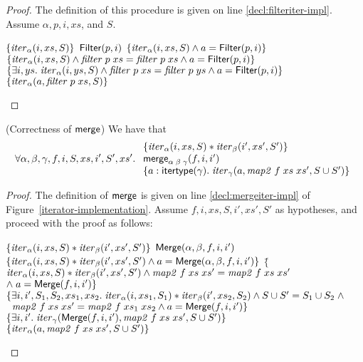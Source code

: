 \begin{proof}
The definition of this procedure is given on line \ref{decl:filteriter-impl}. Assume
$\alpha, p, i, xs$, and $S$. 

\begin{specification}
\nextline $\{{\mathit{iter}_\alpha(i, xs, S)}\}$ 
\nextline $\mathsf{Filter}(p, i)$ 
\nextline $\{{\mathit{iter}_\alpha(i, xs, S) \land a = \mathsf{Filter}(p, i)}\}$ 
\nextline $\{{\mathit{iter}_\alpha(i, xs, S) \land \mathit{filter}\;p\;xs = \mathit{filter}\;p\;xs \land a = \mathsf{Filter}(p, i)}\}$ 
\nextline $\{{\exists i, ys.\; \mathit{iter}_\alpha(i, ys, S) \land \mathit{filter}\;p\;xs = \mathit{filter}\;p\;ys \land a = \mathsf{Filter}(p, i)}\}$
\nextline $\{{\mathit{iter}_\alpha(a, \mathit{filter}\;p\;xs, S)}\}$ 
\end{specification}
\end{proof}

\begin{lemma}{(Correctness of $\mathsf{merge}$)}
We have that 
\begin{displaymath}
  \forall \alpha, \beta, \gamma, f, i, S, xs, i', S', xs'.\; 
  \begin{array}{l}
    \{{\mathit{iter}_\alpha(i, xs, S) * \mathit{iter}_\beta(i',xs',S')}\} \\
    \mathsf{merge}_{\alpha\;\beta\;\gamma}(f, i, i') \\
    \{{a:\mathsf{itertype}(\gamma).\; \mathit{iter}_\gamma(a, \mathit{map2}\;f\;xs\;xs', S \cup S')}\}\\
  \end{array}
\end{displaymath}
\end{lemma}

\begin{proof}
The definition of $\mathsf{merge}$ is given on line \ref{decl:mergeiter-impl} of
Figure~\ref{iterator-implementation}. Assume $f, i, xs, S, i', xs', S'$ as 
hypotheses, and proceed with the proof as follows: 

\begin{specification}
\nextline $\{{\mathit{iter}_\alpha(i, xs, S) * \mathit{iter}_\beta(i',xs',S')}\}$ 
\nextline $\mathsf{Merge}(\alpha, \beta, f, i, i')$
\nextline $\{{\mathit{iter}_\alpha(i, xs, S) * \mathit{iter}_\beta(i',xs',S')  \land a = \mathsf{Merge}(\alpha, \beta, f, i, i')}\}$ 
\nextline $\{$\=$\mathit{iter}_\alpha(i, xs, S) * \mathit{iter}_\beta(i',xs',S')  \land \mathit{map2}\;f\;xs\;xs' = \mathit{map2}\;f\;xs\;xs'$
\nextline \> $\land\; a = \mathsf{Merge}(f, i, i')\}$ 
\nextline $\{\exists i, i', S_1, S_2, xs_1, xs_2.\; \mathit{iter}_\alpha(i, xs_1, S_1) * \mathit{iter}_\beta(i', xs_2, S_2) \land 
                                                    S \cup S' = S_1 \cup S_2 \;\land $
\nextline $\;\;\mathit{map2}\;f\;xs\;xs' = \mathit{map2}\;f\;xs_1\;xs_2 \land 
                                                    a = \mathsf{Merge}(f, i, i')\}$ 
\nextline $\{{\exists i,i'.\; \mathit{iter}_\gamma(\mathsf{Merge}(f, i, i'), \mathit{map2}\;f\;xs\;xs', S \cup S')}\}$ 
\nextline $\{{\mathit{iter}_\alpha(a, \mathit{map2}\;f\;xs\;xs', S \cup S')}\}$

\end{specification}
\end{proof}

